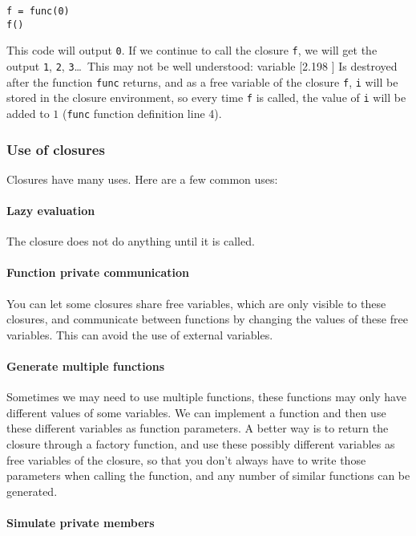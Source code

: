 \begin{lstlisting}[language=berry]
f = func(0)
f()
\end{lstlisting}
This code will output \texttt{0}. If we continue to call the closure \texttt{f}, we will get the output \texttt{1}, \texttt{2}, \texttt{3}\ldots\ This may not be well understood: variable [2.198 ] Is destroyed after the function \texttt{func} returns, and as a free variable of the closure \texttt{f}, \texttt{i} will be stored in the closure environment, so every time \texttt{f} is called, the value of \texttt{i} will be added to $1$ (\texttt{func} function definition line 4).

\subsubsection {Use of closures}

Closures have many uses. Here are a few common uses:

\paragraph{Lazy evaluation}

The closure does not do anything until it is called.

\paragraph{Function private communication}

You can let some closures share free variables, which are only visible to these closures, and communicate between functions by changing the values   of these free variables. This can avoid the use of external variables.

\paragraph{Generate multiple functions}

Sometimes we may need to use multiple functions, these functions may only have different values   of some variables. We can implement a function and then use these different variables as function parameters. A better way is to return the closure through a factory function, and use these possibly different variables as free variables of the closure, so that you don't always have to write those parameters when calling the function, and any number of similar functions can be generated.

\paragraph{Simulate private members}

